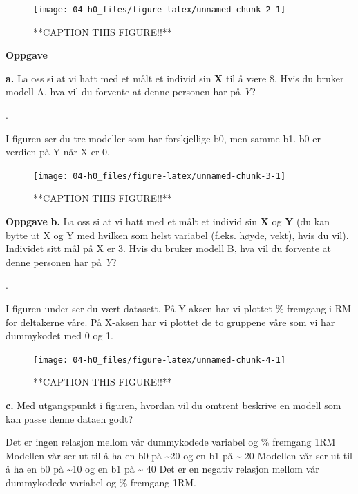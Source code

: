 \documentclass[
]{book}
\begin{document}
\begin{figure}

{\centering \texttt{[image: 04-h0\_files/figure-latex/unnamed-chunk-2-1]} 

}

\caption{**CAPTION THIS FIGURE!!**}\label{fig:unnamed-chunk-2}
\end{figure}

\textbf{Oppgave}

\textbf{a.} La oss si at vi hatt med et målt et individ sin \textbf{X} til å være 8. Hvis du bruker modell A, hva vil du forvente at denne personen har på \emph{Y}?

.

I figuren ser du tre modeller som har forskjellige b0, men samme b1. b0 er verdien på Y når X er 0.

\begin{figure}

{\centering \texttt{[image: 04-h0\_files/figure-latex/unnamed-chunk-3-1]} 

}

\caption{**CAPTION THIS FIGURE!!**}\label{fig:unnamed-chunk-3}
\end{figure}

\textbf{Oppgave}
\textbf{b.} La oss si at vi hatt med et målt et individ sin \textbf{X} og \textbf{Y} (du kan bytte ut X og Y med hvilken som helst variabel (f.eks. høyde, vekt), hvis du vil). Individet sitt mål på X er 3. Hvis du bruker modell B, hva vil du forvente at denne personen har på \emph{Y}?

.

I figuren under ser du vært datasett. På Y-aksen har vi plottet \% fremgang i RM for deltakerne våre. På X-aksen har vi plottet de to gruppene våre som vi har dummykodet med 0 og 1.

\begin{figure}

{\centering \texttt{[image: 04-h0\_files/figure-latex/unnamed-chunk-4-1]} 

}

\caption{**CAPTION THIS FIGURE!!**}\label{fig:unnamed-chunk-4}
\end{figure}

\textbf{c.} Med utgangspunkt i figuren, hvordan vil du omtrent beskrive en modell som kan passe denne dataen godt?

Det er ingen relasjon mellom vår dummykodede variabel og \% fremgang 1RM Modellen vår ser ut til å ha en b0 på \textasciitilde20 og en b1 på \textasciitilde{} 20 Modellen vår ser ut til å ha en b0 på \textasciitilde10 og en b1 på \textasciitilde{} 40 Det er en negativ relasjon mellom vår dummykodede variabel og \% fremgang 1RM.
\end{document}
